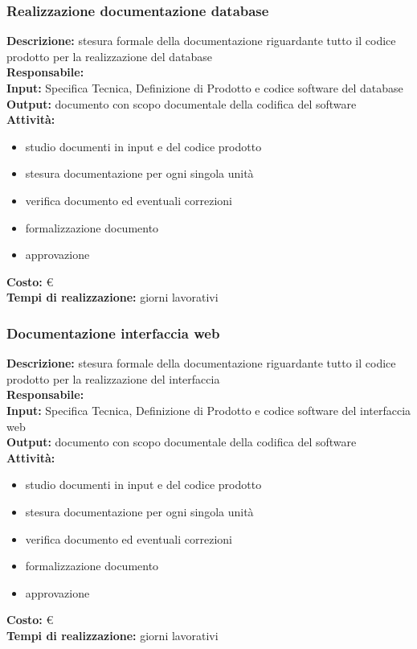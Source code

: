 \subsubsection{Realizzazione documentazione database}
\textbf{Descrizione:} stesura formale della documentazione riguardante tutto il codice prodotto
per la realizzazione del database \\
\linebreak
\textbf{Responsabile:} \\
\linebreak
\textbf{Input:} Specifica Tecnica, Definizione di Prodotto e codice software del database \\
\linebreak
\textbf{Output:} documento con scopo documentale della codifica del software \\
\linebreak
\textbf{Attività:}
\begin{itemize}
\item studio documenti in input e del codice prodotto
\item stesura documentazione per ogni singola unità
\item verifica documento ed eventuali correzioni
\item formalizzazione documento
\item approvazione
\end{itemize}
\textbf{Costo:} \euro \\
\textbf{Tempi di realizzazione:}  giorni lavorativi


\subsubsection{Documentazione interfaccia web}
\textbf{Descrizione:} stesura formale della documentazione riguardante tutto il codice prodotto
per la realizzazione del interfaccia \\
\linebreak
\textbf{Responsabile:} \\
\linebreak
\textbf{Input:} Specifica Tecnica, Definizione di Prodotto e codice software del interfaccia web\\
\linebreak
\textbf{Output:} documento con scopo documentale della codifica del software\\
\linebreak
\textbf{Attività:}
\begin{itemize}
\item studio documenti in input e del codice prodotto
\item stesura documentazione per ogni singola unità
\item verifica documento ed eventuali correzioni
\item formalizzazione documento
\item approvazione
\end{itemize}
\textbf{Costo:} \euro \\
\textbf{Tempi di realizzazione:}  giorni lavorativi


